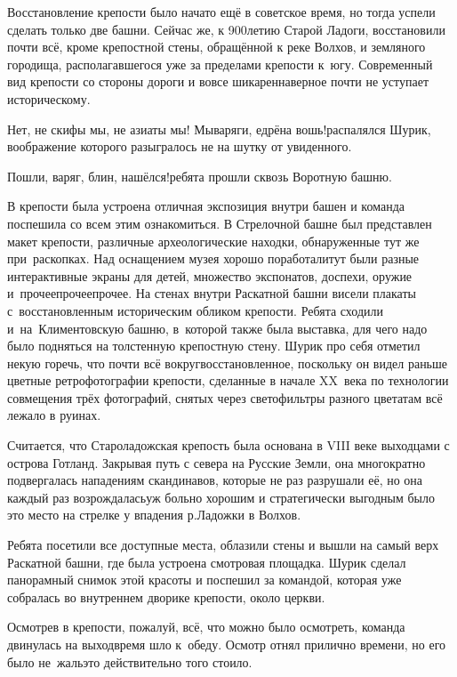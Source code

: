 Восстановление крепости было начато ещё в советское время, но тогда успели сделать только две башни. Сейчас же, к 900\sdash летию Старой Ладоги, восстановили почти всё, кроме крепостной стены, обращённой к реке Волхов, и земляного городища, располагавшегося уже за пределами крепости к~югу. Современный вид крепости со стороны дороги и вовсе шикарен\mdash наверное почти не уступает историческому. 

\diagdash Нет, не скифы мы, не азиаты мы! Мы\mdash варяги, едрёна вошь!\mdash распалялся Шурик, воображение которого разыгралось не на шутку от увиденного.

\diagdash Пошли, варяг, блин, нашёлся!\mdash ребята прошли сквозь Воротную башню.

В крепости была устроена отличная экспозиция внутри башен и команда поспешила со всем этим ознакомиться. В Стрелочной башне был представлен макет крепости, различные археологические находки, обнаруженные тут же при~раскопках. Над оснащением музея хорошо поработали\mdash тут были разные интерактивные экраны для детей, множество экспонатов, доспехи, оружие и~прочее\sdash прочее\sdash прочее. На стенах внутри Раскатной башни висели плакаты с~восстановленным историческим обликом крепости. Ребята сходили и~на~Климентовскую башню, в~которой также была выставка, для чего надо было подняться на толстенную крепостную стену. Шурик про себя отметил некую горечь, что почти всё вокруг\mdash восстановленное, поскольку он видел раньше цветные ретро\sdash фотографии крепости, сделанные в начале XX~века по технологии совмещения трёх фотографий, снятых через светофильтры разного цвета\cite{ПрокудинГорский}\mdash там всё лежало в руинах.

Считается, что Староладожская крепость была основана в VIII веке выходцами с острова Готланд\cite{ЛебедевЛадога}. Закрывая путь с севера на Русские Земли, она многократно подвергалась нападениям скандинавов, которые не раз разрушали её, но она каждый раз возрождалась\mdash уж больно хорошим и стратегически выгодным было это место на стрелке у впадения р.\thinspace Ладожки в Волхов.

Ребята посетили все доступные места, облазили стены и вышли на самый верх Раскатной башни, где была устроена смотровая площадка. Шурик сделал панорамный снимок этой красоты и поспешил за командой, которая уже собралась во внутреннем дворике крепости, около церкви.

Осмотрев в крепости, пожалуй, всё, что можно было осмотреть, команда двинулась на выход\mdash время шло к~обеду. Осмотр отнял прилично времени, но его было не~жаль\mdash это действительно того стоило. 

